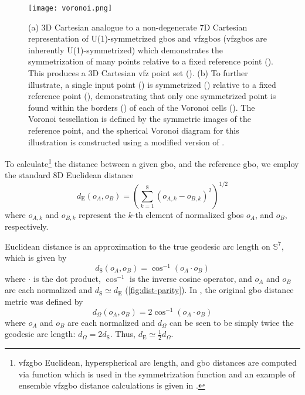 \documentclass[final,twocolumn,12pt]{elsarticle}
\begin{document}
\begin{figure}
    \centering
    \texttt{[image: voronoi.png]}
    \caption{(a) 3D Cartesian analogue to a non-degenerate 7D Cartesian representation of U(1)-symmetrized \glspl{gbo} and \glspl{vfzgbo} (\glspl{vfzgbo} are inherently U(1)-symmetrized) which demonstrates the symmetrization of many points relative to a fixed reference point (). This produces a 3D Cartesian \gls{vfz} point set (\sympt{}). (b) To further illustrate, a single input point (\singlept{}) is symmetrized (\singlesympt{}) relative to a fixed reference point (), demonstrating that only one symmetrized point is found within the borders (\vbordercolor{}) of each of the Voronoi cells (\vcellcolor{}). The Voronoi tessellation is defined by the symmetric images of the reference point, and the spherical Voronoi diagram for this illustration is constructed using a modified version of \cite{luongVoronoiSphere2020}.}
    \label{fig:voronoi}
\end{figure}

To calculate\footnote{\Gls{vfzgbo} Euclidean, hyperspherical arc length, and \gls{gbo} distances are computed via \vfzorepo{} function  which is used in the symmetrization function  and an example of ensemble \gls{vfzgbo} distance calculations is given in .} the distance between a given \gls{gbo}, and the reference \gls{gbo}, we employ the standard 8D Euclidean distance
\begin{equation}
    \label{eq:8Deuclidean_dist}
    d_{\text{E}}\!\left(o_{A},o_{B}\right) = {\left(\sum_{k=1}^{8} {\left(o_{A,k} - o_{B,k}\right)}^2 \right)}^{1/2}
\end{equation}
where $o_{A,k}$ and $o_{B,k}$ represent the $k$-th element of normalized \glspl{gbo} $o_A$, and $o_B$, respectively. 

Euclidean distance is an approximation to the true geodesic arc length on $\mathbb{S}^7$, which is given by
\begin{equation}
    \label{eq:7sphere_arc_length}
    d_{\text{S}}\!\left(o_{A},o_{B}\right)=\cos ^{-1}\left(o_A\cdot o_B\right)
\end{equation}
where $\cdot$ is the dot product, $\cos ^{-1}$ is the inverse cosine operator, and $o_A$ and $o_B$ are each normalized and $d_{\text{S}}\simeq d_{\text{E}}$ (\cref{fig:dist-parity}). In \cite{francisGeodesicOctonionMetric2019}, the original \gls{gbo} distance metric was defined by
\begin{equation}
    \label{eq:omega}
    d_\Omega\!\left(o_{A},o_{B}\right) = 2\cos ^{-1}\left(o_A\cdot o_B\right)
\end{equation}
where $o_A$ and $o_B$ are each normalized and $d_\Omega$ can be seen to be simply twice the geodesic arc length: $d_\Omega = 2 d_{\text{S}}$. Thus,
$d_\text{E}\simeq \frac{1}{2}d_\Omega$.
\end{document}
